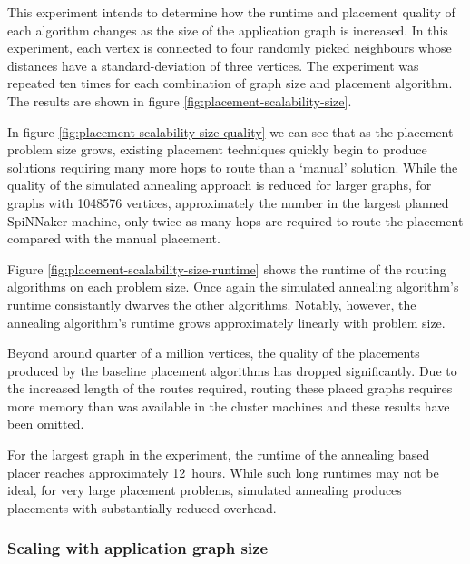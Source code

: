 				This experiment intends to determine how the runtime and placement
				quality of each algorithm changes as the size of the application graph
				is increased. In this experiment, each vertex is connected to four
				randomly picked neighbours whose distances have a standard-deviation of
				three vertices.  The experiment was repeated ten times for each
				combination of graph size and placement algorithm. The results are
				shown in figure \ref{fig:placement-scalability-size}.
				
				In figure \ref{fig:placement-scalability-size-quality} we can see that
				as the placement problem size grows, existing placement techniques
				quickly begin to produce solutions requiring many more hops to route
				than a `manual' solution. While the quality of the simulated annealing
				approach is reduced for larger graphs, for graphs with \num{1048576}
				vertices, approximately the number in the largest planned SpiNNaker
				machine, only twice as many hops are required to route the placement
				compared with the manual placement.
				
				Figure \ref{fig:placement-scalability-size-runtime} shows the runtime
				of the routing algorithms on each problem size. Once again the
				simulated annealing algorithm's runtime consistantly dwarves the other
				algorithms. Notably, however, the annealing algorithm's runtime grows
				approximately linearly with problem size.
				
				Beyond around quarter of a million vertices, the quality of the
				placements produced by the baseline placement algorithms has dropped
				significantly. Due to the increased length of the routes required,
				routing these placed graphs requires more memory than was available in
				the cluster machines and these results have been omitted.
				
				For the largest graph in the experiment, the runtime of the annealing
				based placer reaches approximately 12~hours. While such long runtimes
				may not be ideal, for very large placement problems, simulated
				annealing produces placements with substantially reduced overhead.
			
			
			\subsubsection{Scaling with application graph size}
			
